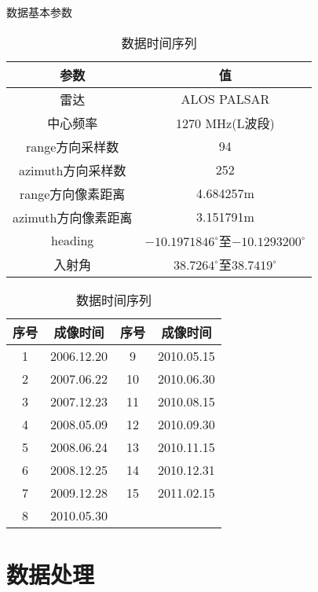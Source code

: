 \begin{table}
    \centering\small
    \begin{minipage}{0.8\textwidth}
        \centering\small
    \caption{数据基本参数}
    \label{tab:palsar}
    \begin{tabular}{@{}cc@{}}
    \toprule
    参数           & 值 \\ 
    \midrule
    雷达           & ALOS PALSAR  \\
    中心频率         & 1270 MHz(L波段) \\
    range方向采样数   & 94  \\
    azimuth方向采样数 & 252  \\
    range方向像素距离 & 4.684257m \\
    azimuth方向像素距离 & 3.151791m \\
    heading      & $-10.1971846^{\circ}$至$-10.1293200^{\circ}$ \\
    入射角          & $38.7264^{\circ}$至$38.7419^{\circ}$  \\
    \bottomrule
    \end{tabular}
    \end{minipage}
    \begin{minipage}{0.8\textwidth}
        \centering\small
        \caption{数据时间序列}
        \label{tab:timeseries}
        \begin{tabular}{@{}cccc@{}}
        \toprule
        序号 & 成像时间 & 序号 & 成像时间\\ 
        \midrule
        1 & 2006.12.20 & 9 & 2010.05.15 \\
        2 & 2007.06.22 & 10 & 2010.06.30 \\
        3 & 2007.12.23 & 11 & 2010.08.15 \\
        4 & 2008.05.09 & 12 & 2010.09.30 \\
        5 & 2008.06.24 & 13 & 2010.11.15 \\
        6 & 2008.12.25 & 14 & 2010.12.31 \\
        7 & 2009.12.28 & 15 & 2011.02.15 \\
        8 & 2010.05.30 & & \\
        \bottomrule
        \end{tabular}   
    \end{minipage}
\end{table}

\section{数据处理}

